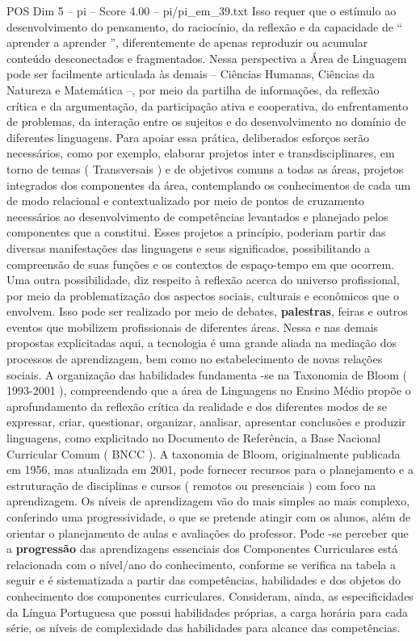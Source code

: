 \begin{textsample}{POS Dim 5 – pi – Score 4.00 – pi/pi\_em\_39.txt}
Isso requer que o estímulo ao desenvolvimento do pensamento, do raciocínio, da reflexão e da capacidade de “ aprender a aprender ”, diferentemente de apenas reproduzir ou acumular conteúdo desconectados e fragmentados.
Nessa perspectiva a Área de Linguagem pode ser facilmente articulada às demais – Ciências Humanas, Ciências da Natureza e Matemática –, por meio da partilha de informações, da reflexão crítica e da argumentação, da participação ativa e cooperativa, do enfrentamento de problemas, da interação entre os sujeitos e do desenvolvimento no domínio de diferentes linguagens.
Para apoiar essa prática, deliberados esforços serão necessários, como por exemplo, elaborar projetos inter e transdisciplinares, em torno de temas ( Transversais ) e de objetivos comuns a todas as áreas, projetos integrados dos componentes da área, contemplando os conhecimentos de cada um de modo relacional e contextualizado por meio de pontos de cruzamento necessários ao desenvolvimento de competências levantados e planejado pelos componentes que a constitui.
Esses projetos a princípio, poderiam partir das diversas manifestações das linguagens e seus significados, possibilitando a compreensão de suas funções e os contextos de espaço-tempo em que ocorrem.
Uma outra possibilidade, diz respeito à reflexão acerca do universo profissional, por meio da problematização dos aspectos sociais, culturais e econômicos que o envolvem.
Isso pode ser realizado por meio de debates, \textbf{palestras}, feiras e outros eventos que mobilizem profissionais de diferentes áreas.
Nessa e nas demais propostas explicitadas aqui, a tecnologia é uma grande aliada na mediação dos processos de aprendizagem, bem como no estabelecimento de novas relações sociais.
A organização das habilidades fundamenta -se na Taxonomia de Bloom ( 1993-2001 ), compreendendo que a área de Linguagens no Ensino Médio propõe o aprofundamento da reflexão crítica da realidade e dos diferentes modos de se expressar, criar, questionar, organizar, analisar, apresentar conclusões e produzir linguagens, como explicitado no Documento de Referência, a Base Nacional Curricular Comum ( BNCC ).
A taxonomia de Bloom, originalmente publicada em 1956, mas atualizada em 2001, pode fornecer recursos para o planejamento e a estruturação de disciplinas e cursos ( remotos ou presenciais ) com foco na aprendizagem.
Os níveis de aprendizagem vão do mais simples ao mais complexo, conferindo uma progressividade, o que se pretende atingir com os alunos, além de orientar o planejamento de aulas e avaliações do professor.
Pode -se perceber que a \textbf{progressão} das aprendizagens essenciais dos Componentes Curriculares está relacionada com o nível/ano do conhecimento, conforme se verifica na tabela a seguir e é sistematizada a partir das competências, habilidades e dos objetos do conhecimento dos componentes curriculares.
Consideram, ainda, as especificidades da Língua Portuguesa que possui habilidades próprias, a carga horária para cada série, os níveis de complexidade das habilidades para alcance das competências.

\end{textsample}
